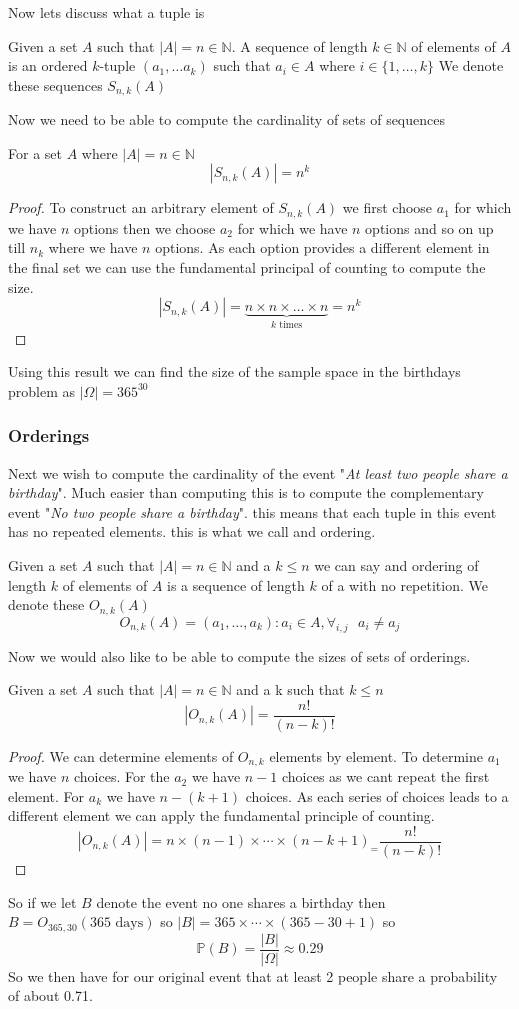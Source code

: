 \documentclass{article}
\begin{document}
Now lets discuss what a tuple is
\begin{definition}
    Given a set $A$ such that $|A| = n \in \mathbb{N}$. A sequence of length $k \in \mathbb{N}$ of elements of $A$ is an ordered $k$-tuple $(a_1,\dots a_k)$ such that $a_i \in A$ where $i \in \{1,\dots,k\}$   
    We denote these sequences $S_{n,k}(A)$
\end{definition}
Now we need to be able to compute the cardinality of sets of sequences
\begin{proposition}
    For a set $A$ where $|A| = n \in \mathbb{N}$
    \[|S_{n,k}(A)| = n^k\]
\end{proposition}
\begin{proof}
    To construct an arbitrary element of $S_{n,k}(A)$ we first choose $a_1$ for which we have $n$ options then we choose $a_2$ for which we have $n$ options and so on up till $n_k$ where we have $n$ options. As each option provides a different element in the final set we can use the fundamental principal of counting to compute the size. 
    \[|S_{n,k}(A)| = \underbrace{n\times n \times \dots \times n}_{k \text{ times}} = n^k\]
\end{proof}
Using this result we can find the size of the sample space in the birthdays problem as $|\Omega| = 365 ^ {30}$ 
\subsubsection{Orderings}
Next we wish to compute the cardinality of the event "\textit{At least two people share a birthday}". Much easier than computing this is to compute the complementary event "\textit{No two people share a birthday}". this means that each tuple in this event has no repeated elements. this is what we call and ordering.
\begin{definition}
    Given a set $A$ such that $|A| = n \in \mathbb{N}$ and a $k \le n$ we can say and ordering of length $k$ of elements of $A$ is a sequence of length $k$ of a with no repetition. We denote these $O_{n,k}(A)$
    \[O_{n,k}(A) = (a_1,\dots,a_k) : a_i \in A,\forall_{i,j}\text{ }a_i \ne a_j\]
\end{definition}
Now we would also like to be able to compute the sizes of sets of orderings.
\begin{proposition}
    Given a set $A$ such that $|A| = n \in \mathbb{N}$ and a k such that $k \le n$
    \[|O_{n,k}(A)| = \frac{n!}{(n-k)!}\]
\end{proposition}
\begin{proof}
    We can determine elements of $O_{n,k}$ elements by element. To determine $a_1$ we have $n$ choices. For the $a_2$ we have $n-1$ choices as we cant repeat the first element. For $a_k$ we have $n - (k+1)$ choices. As each series of choices leads to a different element we can apply the fundamental principle of counting.
    \[|O_{n,k}(A)| =n \times (n-1) \times \cdots \times (n - k +1)_= \frac{n!}{(n-k)!}\]
\end{proof}
So if we let $B$ denote the event no one shares a birthday then 
$B = O_{365,30}(\text{365 days})$ so $|B| = 365 \times \cdots \times (365 - 30 + 1)$ so 
\[\mathbb{P}(B) = \frac{|B|}{|\Omega|} \approx 0.29\]
So we then have for our original event that at least 2 people share a probability of about 0.71.
\end{document}
